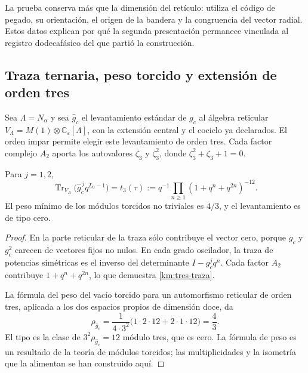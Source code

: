 La prueba conserva más que la dimensión del retículo: utiliza el código
de pegado, su orientación, el origen de la bandera y la congruencia del
vector radial. Estos datos explican por qué la segunda presentación
permanece vinculada al registro dodecafásico del que partió la construcción.

\subsection{Traza ternaria, peso torcido y extensión de orden tres}
\label{km:orbifold-tres}

Sea \(\Lambda=N_\alpha\) y sea \(\widehat g_c\) el levantamiento
estándar de \(g_c\) al álgebra reticular
\(V_\Lambda=M(1)\otimes\mathbb C_\varepsilon[\Lambda]\), con la
extensión central y el cociclo ya declarados. El orden impar permite
elegir este levantamiento de orden tres. Cada factor complejo \(A_2\)
aporta los autovalores \(\zeta_3\) y \(\zeta_3^2\), donde
\(\zeta_3^2+\zeta_3+1=0\).

\begin{proposition}
\label{km:traza-tipo}
Para \(j=1,2\),
\begin{equation}
 \operatorname{Tr}_{V_\Lambda}
       \bigl(\widehat g_c^{\,j}q^{L_0-1}\bigr)
 =t_3(\tau)
 :=q^{-1}\prod_{n\ge1}(1+q^n+q^{2n})^{-12}.
 \label{km:tres-traza}
\end{equation}
El peso mínimo de los módulos torcidos no triviales es \(4/3\), y
el levantamiento es de tipo cero.
\end{proposition}
\begin{proof}
En la parte reticular de la traza sólo contribuye el vector cero,
porque \(g_c\) y \(g_c^2\) carecen de vectores fijos no nulos.
En cada grado oscilador, la traza de potencias simétricas es el inverso
del determinante \(I-g_c^jq^n\). Cada factor \(A_2\) contribuye
\(1+q^n+q^{2n}\), lo que demuestra \eqref{km:tres-traza}.

La fórmula del peso del vacío torcido para un automorfismo reticular de
orden tres, aplicada a los dos espacios propios de dimensión doce, da
\[
 \rho_{\widehat g_c}
 =\frac{1}{4\cdot3^2}
   \bigl(1\cdot2\cdot12+2\cdot1\cdot12\bigr)=\frac43.
\]
El tipo es la clase de \(3^2\rho_{\widehat g_c}=12\) módulo
tres, que es cero. La fórmula de peso es un resultado de la teoría de
módulos torcidos; las multiplicidades y la isometría que la alimentan
se han construido aquí.
\end{proof}

